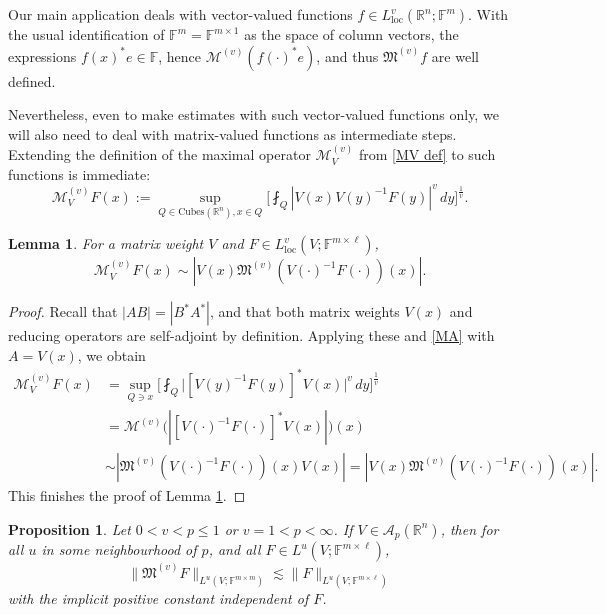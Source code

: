 \documentclass[11pt, reqno]{amsart}
\newtheorem{proposition}[theorem]{Proposition}
\newtheorem{lemma}[theorem]{Lemma}
\theoremstyle{definition}
\theoremstyle{remark}
\numberwithin{equation}{section}
\newcommand{\A}{\mathscr A}
\newcommand{\F}{\mathbb F}
\newcommand{\M}{\mathfrak M}
\newcommand{\R}{\mathbb R}
\newcommand{\loc}{\mathrm{loc}}
\newcommand{\abs}[1]{|#1|}
\newcommand{\Norm}[2]{\|#1\|_{#2}}
\newcommand{\Cubes}{\mathrm{Cubes}}
\begin{document}
Our main application deals with vector-valued functions $f\in L^v_{\loc}(\R^n;\F^m)$. With the usual identification of $\F^m=\F^{m\times 1}$ as the space of column vectors, the expressions $f(x)^*e\in\F$, hence $\mathcal M^{(v)}(f(\cdot)^*e)$, and thus $\M^{(v)}f$ are well defined.

Nevertheless, even to make estimates with such vector-valued functions only, we will also need to deal with matrix-valued functions as intermediate steps. Extending the definition of the maximal operator $\mathcal M_V^{(v)}$ from \eqref{MV def} to such functions is immediate:
$$
\mathcal M_V^{(v)}F(x)
:=\sup_{Q\in\Cubes(\R^{n}), x\in Q}\bigg[\fint_Q\abs{V(x)V(y)^{-1}F(y)}^{v}\,dy\bigg]^{\frac 1v}.
$$

\begin{lemma}\label{MVvsMnew}
For a matrix weight $V$ and $F\in L^v_{\loc}(V;\F^{m\times\ell})$,
\begin{equation*}
\mathcal M_V^{(v)}F(x)
\sim\abs{V(x)\M^{(v)}(V(\cdot)^{-1}F(\cdot))(x)}.
\end{equation*}
\end{lemma}

\begin{proof}
Recall that $\abs{AB}=\abs{B^*A^*}$, and that both matrix weights $V(x)$ and reducing operators are self-adjoint by definition.
Applying these and \eqref{MA} with $A=V(x)$, we obtain
\begin{align*}
\mathcal M_V^{(v)}F(x)
&=\sup_{Q\ni x}\bigg[\fint_Q
\Big| [V(y)^{-1}F(y)]^* V(x) \Big|^v \, dy\bigg]^{\frac 1v} \\
&=\mathcal M^{(v)}\Big( |[V(\cdot)^{-1}F(\cdot)]^*V(x)|\Big)(x) \\
&\sim\abs{\M^{(v)}(V(\cdot)^{-1}F(\cdot))(x)V(x)}
=\abs{V(x)\M^{(v)}(V(\cdot)^{-1}F(\cdot))(x)}.
\end{align*}
This finishes the proof of Lemma \ref{MVvsMnew}.
\end{proof}

\begin{proposition}\label{newMbd}
Let $0<v<p\leq 1$ or $v=1<p<\infty$. If $V\in\A_p(\R^n)$, then for all $u$ in some neighbourhood of $p$, and all $F\in L^u(V;\F^{m\times\ell})$,
\begin{equation*}
\Norm{\M^{(v)}F}{L^u(V;\F^{m\times m})}\lesssim\Norm{F}{L^u(V;\F^{m\times\ell})}
\end{equation*}
with the implicit positive constant independent of $F$.
\end{proposition}
\end{document}
